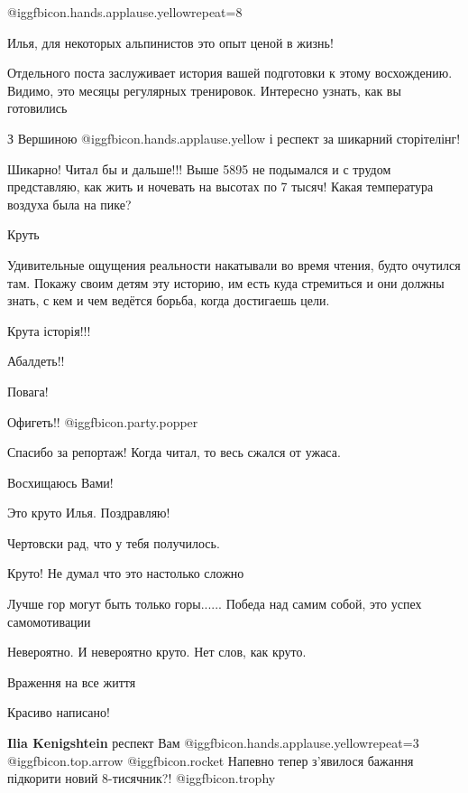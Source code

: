 \begin{itemize}
 @igg{fbicon.hands.applause.yellow}{repeat=8} 


Илья, для некоторых альпинистов это опыт ценой в жизнь!

Отдельного поста заслуживает история вашей подготовки к этому восхождению.
Видимо, это месяцы регулярных тренировок. Интересно узнать, как вы готовились


З Вершиною  @igg{fbicon.hands.applause.yellow}  і респект за шикарний сторітелінг!


Шикарно! Читал бы и дальше!!! Выше 5895 не подымался и с трудом представляю,
как жить и ночевать на высотах по 7 тысяч! Какая температура воздуха была на
пике?

Круть


Удивительные ощущения реальности накатывали во время чтения, будто очутился
там. Покажу своим детям эту историю, им есть куда стремиться и они должны
знать, с кем и чем ведётся борьба, когда достигаешь цели.


Крута історія!!!

Абалдеть!!

Повага!

Офигеть!!  @igg{fbicon.party.popper} 

Спасибо за репортаж!
Когда читал, то весь сжался от ужаса.

Восхищаюсь Вами!

Это круто Илья. Поздравляю!

Чертовски рад, что у тебя получилось.

Круто! Не думал что это настолько сложно

Лучше гор могут быть только горы......
Победа над самим собой, это успех самомотивации


Невероятно. И невероятно круто. Нет слов, как круто.

Враження на все життя

Красиво написано!

\textbf{Ilia Kenigshtein} респект Вам  @igg{fbicon.hands.applause.yellow}{repeat=3}  @igg{fbicon.top.arrow}  @igg{fbicon.rocket} 
Напевно тепер з’явилося бажання підкорити новий 8-тисячник?! @igg{fbicon.trophy} 


\end{itemize}

